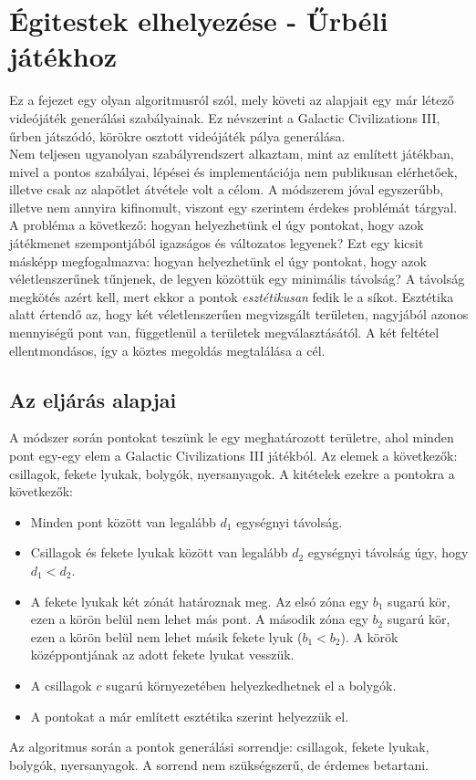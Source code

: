 \chapter{Égitestek elhelyezése - Űrbéli játékhoz}
Ez a fejezet egy olyan algoritmusról szól, mely követi az alapjait egy már létező videójáték generálási szabályainak. Ez névszerint a Galactic Civilizations III, űrben játszódó, körökre osztott videójáték pálya generálása.\\
Nem teljesen ugyanolyan szabályrendszert alkaztam, mint az említett játékban, mivel a pontos szabályai, lépései és implementációja nem publikusan elérhetőek, illetve csak az alapötlet átvétele volt a célom. A módszerem jóval egyszerűbb, illetve nem annyira kifinomult, viszont egy szerintem érdekes problémát tárgyal.\\
A probléma a következő: hogyan helyezhetünk el úgy pontokat, hogy azok játékmenet szempontjából igazságos és változatos legyenek? Ezt egy kicsit másképp megfogalmazva: hogyan helyezhetünk el úgy pontokat, hogy azok véletlenszerűnek tűnjenek, de legyen közöttük egy minimális távolság? A távolság megkötés azért kell, mert ekkor a pontok \textit{esztétikusan} fedik le a síkot. Esztétika alatt értendő az, hogy két véletlenszerűen megvizsgált területen, nagyjából azonos mennyiségű pont van, függetlenül a területek megválasztásától. A két feltétel ellentmondásos, így a köztes megoldás megtalálása a cél.

\section{Az eljárás alapjai}
A módszer során pontokat teszünk le egy meghatározott területre, ahol minden pont egy-egy elem a Galactic Civilizations III játékból. Az elemek a következők: csillagok, fekete lyukak, bolygók, nyersanyagok. A kitételek ezekre a pontokra a következők:
\begin{itemize}
    \item Minden pont között van legalább $d_1$ egységnyi távolság.
    \item Csillagok és fekete lyukak között van legalább $d_2$ egységnyi távolság úgy, hogy $d_1 < d_2$.
    \item A fekete lyukak két zónát határoznak meg. Az elsó zóna egy $b_1$ sugarú kör, ezen a körön belül nem lehet más pont. A második zóna egy $b_2$ sugarú kör, ezen a körön belül nem lehet másik fekete lyuk ($b_1 < b_2$). A körök középpontjának az adott fekete lyukat vesszük.
    \item A csillagok $c$ sugarú környezetében helyezkedhetnek el a bolygók.
    \item A pontokat a már említett esztétika szerint helyezzük el.
\end{itemize}
Az algoritmus során a pontok generálási sorrendje: csillagok, fekete lyukak, bolygók, nyersanyagok. A sorrend nem szükségszerű, de érdemes betartani.


